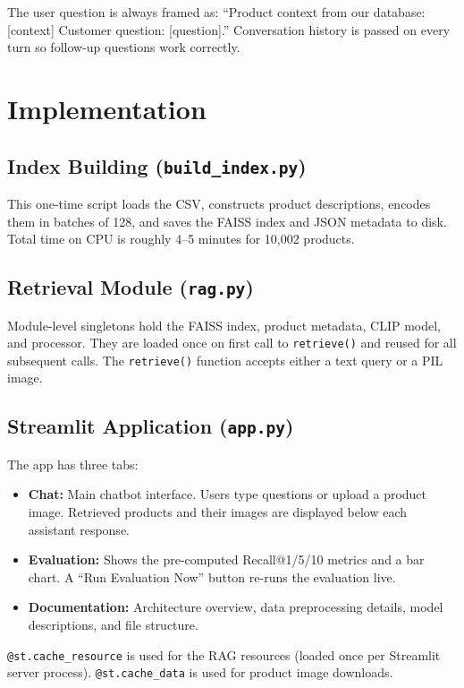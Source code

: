 \documentclass[11pt]{article}
\begin{document}
The user question is always framed as: ``Product context from our database: [context]
Customer question: [question].'' Conversation history is passed on every turn so follow-up
questions work correctly.

\section{Implementation}

\subsection{Index Building (\texttt{build\_index.py})}
This one-time script loads the CSV, constructs product descriptions, encodes them in batches
of 128, and saves the FAISS index and JSON metadata to disk. Total time on CPU is roughly
4--5 minutes for 10,002 products.

\subsection{Retrieval Module (\texttt{rag.py})}
Module-level singletons hold the FAISS index, product metadata, CLIP model, and processor.
They are loaded once on first call to \texttt{retrieve()} and reused for all subsequent calls.
The \texttt{retrieve()} function accepts either a text query or a PIL image.

\subsection{Streamlit Application (\texttt{app.py})}
The app has three tabs:
\begin{itemize}
    \item \textbf{Chat:} Main chatbot interface. Users type questions or upload a product
    image. Retrieved products and their images are displayed below each assistant response.
    \item \textbf{Evaluation:} Shows the pre-computed Recall@1/5/10 metrics and a bar chart.
    A ``Run Evaluation Now'' button re-runs the evaluation live.
    \item \textbf{Documentation:} Architecture overview, data preprocessing details, model
    descriptions, and file structure.
\end{itemize}

\texttt{@st.cache\_resource} is used for the RAG resources (loaded once per Streamlit server
process). \texttt{@st.cache\_data} is used for product image downloads.
\end{document}
